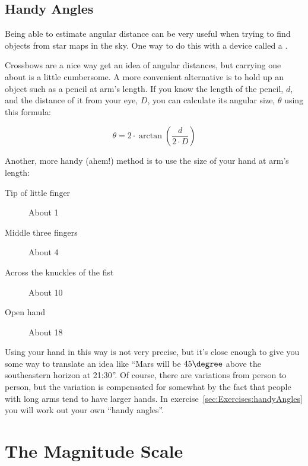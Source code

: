 \subsection{Handy Angles}
\label{sec:Concepts:Angles:HandyAngles}

Being able to estimate angular distance can be very useful when trying
to find objects from star maps in the sky. One way to do this with a
device called a .


Crossbows are a nice way get an idea of angular distances, but carrying
one about is a little cumbersome. A more convenient alternative is to
hold up an object such as a pencil at arm's length. If you know the
length of the pencil, $d$, and the distance of it from your eye, $D$, you
can calculate its angular size, $\theta$ using this formula:

\begin{equation}
\label{eq:handyAngle}
\theta=2 \cdot \arctan{\left(\frac{d}{2 \cdot D}\right) }
\end{equation}


\noindent Another, more handy (ahem!) method is to use the size of your hand at
arm's length:

\begin{description}
\item[Tip of little finger] About 1\degree 
\item[Middle three fingers] About 4\degree 
\item[Across the knuckles of the fist] About 10\degree 
\item[Open hand] About 18\degree
\end{description}

Using your hand in this way is not very precise, but it's close enough
to give you some way to translate an idea like ``Mars will be
$45\degree$ above the southeastern horizon at 21:30''. Of course,
there are variations from person to person, but the variation is
compensated for somewhat by the fact that people with long arms tend
to have larger hands. In exercise~\ref{sec:Exercises:handyAngles} you
will work out your own ``handy angles''.



\section{The Magnitude Scale}
\label{sec:Concepts:Magnitudes}


